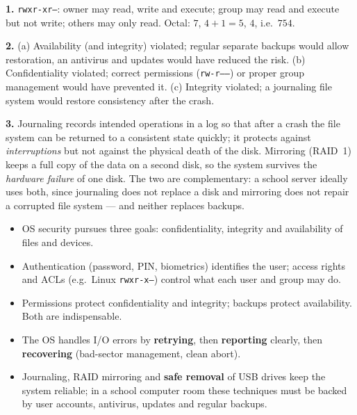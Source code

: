 \documentclass[11pt]{article}
\newcommand{\cle}[1]{{\popxbold\color{popdark}#1}}
\begin{document}
\begin{corrige}[Exercise 1]
\textbf{1.} \texttt{rwxr-xr--}: owner may read, write and execute; group may read and execute but not write; others may only read. Octal: $7$, $4+1=5$, $4$, i.e.\ $754$.

\textbf{2.} (a) Availability (and integrity) violated; regular separate backups would allow restoration, an antivirus and updates would have reduced the risk. (b) Confidentiality violated; correct permissions (\texttt{rw-r-----}) or proper group management would have prevented it. (c) Integrity violated; a journaling file system would restore consistency after the crash.

\textbf{3.} Journaling records intended operations in a log so that after a crash the file system can be returned to a consistent state quickly; it protects against \emph{interruptions} but not against the physical death of the disk. Mirroring (RAID~1) keeps a full copy of the data on a second disk, so the system survives the \emph{hardware failure} of one disk. The two are complementary: a school server ideally uses both, since journaling does not replace a disk and mirroring does not repair a corrupted file system --- and neither replaces backups.
\end{corrige}

\begin{aretenir}
\begin{itemize}
\item OS security pursues three goals: \cle{confidentiality}, \cle{integrity} and \cle{availability} of files and devices.
\item \cle{Authentication} (password, PIN, biometrics) identifies the user; \cle{access rights} and \cle{ACLs} (e.g.\ Linux \texttt{rwxr-x---}) control what each user and group may do.
\item Permissions protect confidentiality and integrity; \cle{backups} protect availability. Both are indispensable.
\item The OS handles I/O errors by \textbf{retrying}, then \textbf{reporting} clearly, then \textbf{recovering} (bad-sector management, clean abort).
\item \cle{Journaling}, \cle{RAID} mirroring and \textbf{safe removal} of USB drives keep the system reliable; in a school computer room these techniques must be backed by user accounts, antivirus, updates and regular backups.
\end{itemize}
\end{aretenir}
\end{document}
